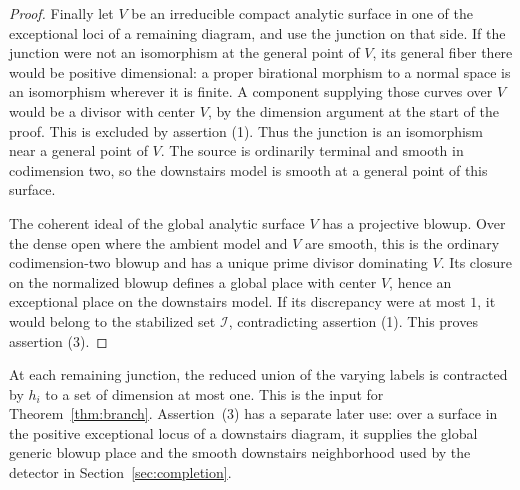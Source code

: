 \begin{proof}
Finally let $V$ be an irreducible compact analytic surface in one of the exceptional loci of a
remaining diagram, and use the junction on that side.  If the junction
were not an isomorphism at the general point of $V$, its general fiber
there would be positive dimensional: a proper birational morphism to a
normal space is an isomorphism wherever it is finite.  A component
supplying those curves over $V$ would be a divisor with center $V$, by
the dimension argument at the start of the proof.  This is excluded by
assertion (1).  Thus the junction is an isomorphism near a general point
of $V$.  The source is ordinarily terminal and smooth in codimension two,
so the downstairs model is smooth at a general point of this surface.

The coherent ideal of the global analytic surface $V$ has a projective
blowup.  Over the dense open where the ambient model and $V$ are smooth,
this is the ordinary codimension-two blowup and has a unique prime
divisor dominating $V$.  Its closure on the normalized blowup defines
a global place with center $V$, hence an exceptional place on the
downstairs model.  If its discrepancy were at most $1$, it would belong
to the stabilized set $\mathcal I$, contradicting assertion (1).
This proves assertion (3).
\end{proof}

At each remaining junction, the reduced union of the varying labels is
contracted by $h_i$ to a set of dimension at most one.  This is the input
for Theorem~\ref{thm:branch}.  Assertion~(3) has a separate later use:
over a surface in the positive exceptional locus of a downstairs diagram,
it supplies the global generic blowup place and the smooth downstairs
neighborhood used by the detector in Section~\ref{sec:completion}.
